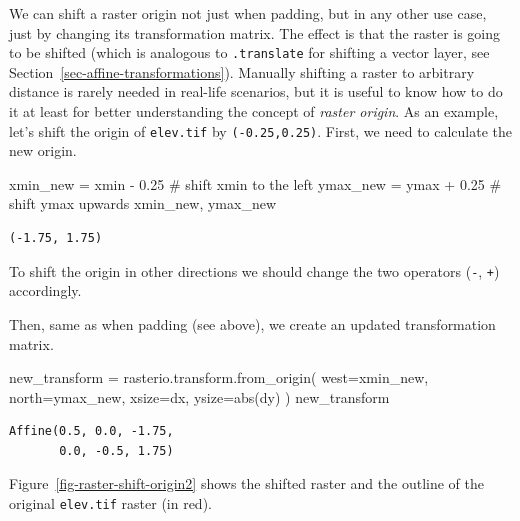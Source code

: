 \documentclass[
  letterpaper,
]{krantz}
\newenvironment{Shaded}{\begin{snugshade}}{\end{snugshade}}
\newcommand{\BuiltInTok}[1]{\textcolor[rgb]{0.00,0.23,0.31}{#1}}
\newcommand{\CommentTok}[1]{\textcolor[rgb]{0.37,0.37,0.37}{#1}}
\newcommand{\FloatTok}[1]{\textcolor[rgb]{0.68,0.00,0.00}{#1}}
\newcommand{\NormalTok}[1]{\textcolor[rgb]{0.00,0.23,0.31}{#1}}
\newcommand{\OperatorTok}[1]{\textcolor[rgb]{0.37,0.37,0.37}{#1}}
\begin{document}
We can shift a raster origin not just when padding, but in any other use
case, just by changing its transformation matrix. The effect is that the
raster is going to be shifted (which is analogous to \texttt{.translate}
for shifting a vector layer, see
Section~\ref{sec-affine-transformations}). Manually shifting a raster to
arbitrary distance is rarely needed in real-life scenarios, but it is
useful to know how to do it at least for better understanding the
concept of \emph{raster origin}. As an example, let's shift the origin
of \texttt{elev.tif} by \texttt{(-0.25,0.25)}. First, we need to
calculate the new origin.

\begin{Shaded}
\begin{Highlighting}[]
\NormalTok{xmin\_new }\OperatorTok{=}\NormalTok{ xmin }\OperatorTok{{-}} \FloatTok{0.25}  \CommentTok{\# shift xmin to the left}
\NormalTok{ymax\_new }\OperatorTok{=}\NormalTok{ ymax }\OperatorTok{+} \FloatTok{0.25}  \CommentTok{\# shift ymax upwards}
\NormalTok{xmin\_new, ymax\_new}
\end{Highlighting}
\end{Shaded}

\begin{verbatim}
(-1.75, 1.75)
\end{verbatim}

To shift the origin in other directions we should change the two
operators (\texttt{-}, \texttt{+}) accordingly.

Then, same as when padding (see above), we create an updated
transformation matrix.

\begin{Shaded}
\begin{Highlighting}[]
\NormalTok{new\_transform }\OperatorTok{=}\NormalTok{ rasterio.transform.from\_origin(}
\NormalTok{    west}\OperatorTok{=}\NormalTok{xmin\_new, }
\NormalTok{    north}\OperatorTok{=}\NormalTok{ymax\_new, }
\NormalTok{    xsize}\OperatorTok{=}\NormalTok{dx, }
\NormalTok{    ysize}\OperatorTok{=}\BuiltInTok{abs}\NormalTok{(dy)}
\NormalTok{)}
\NormalTok{new\_transform}
\end{Highlighting}
\end{Shaded}

\begin{verbatim}
Affine(0.5, 0.0, -1.75,
       0.0, -0.5, 1.75)
\end{verbatim}

Figure~\ref{fig-raster-shift-origin2} shows the shifted raster and the
outline of the original \texttt{elev.tif} raster (in red).
\end{document}
